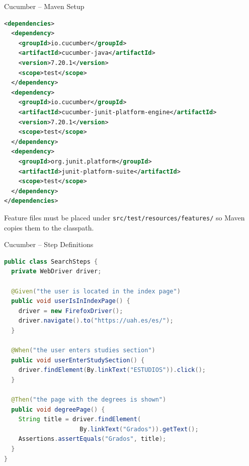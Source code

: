 \documentclass[11pt, xcolor=svgnames]{beamer}
\begin{document}

\begin{frame}[fragile]{Cucumber -- Maven Setup}

\begin{lstlisting}[language=XML,basicstyle=\tiny]
<dependencies>
  <dependency>
    <groupId>io.cucumber</groupId>
    <artifactId>cucumber-java</artifactId>
    <version>7.20.1</version>
    <scope>test</scope>
  </dependency>
  <dependency>
    <groupId>io.cucumber</groupId>
    <artifactId>cucumber-junit-platform-engine</artifactId>
    <version>7.20.1</version>
    <scope>test</scope>
  </dependency>
  <dependency>
    <groupId>org.junit.platform</groupId>
    <artifactId>junit-platform-suite</artifactId>
    <scope>test</scope>
  </dependency>
</dependencies>
\end{lstlisting}

Feature files must be placed under \texttt{src/test/resources/features/} so Maven copies them to the classpath.

\end{frame}


\begin{frame}[fragile]{Cucumber -- Step Definitions}

\begin{lstlisting}[language=Java,basicstyle=\scriptsize]
public class SearchSteps {
  private WebDriver driver;

  @Given("the user is located in the index page")
  public void userIsInIndexPage() {
    driver = new FirefoxDriver();
    driver.navigate().to("https://uah.es/es/");
  }

  @When("the user enters studies section")
  public void userEnterStudySection() {
    driver.findElement(By.linkText("ESTUDIOS")).click();
  }

  @Then("the page with the degrees is shown")
  public void degreePage() {
    String title = driver.findElement(
                     By.linkText("Grados")).getText();
    Assertions.assertEquals("Grados", title);
  }
}
\end{lstlisting}

\end{frame}

\end{document}
